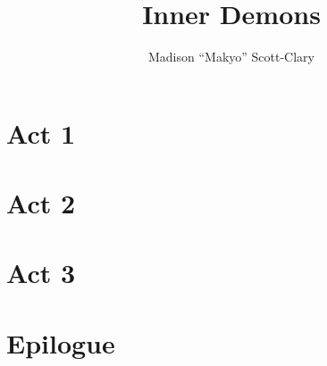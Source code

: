 \documentclass[12pt,letterpaper,oneside]{memoir}
\title{Inner Demons}
\author{Madison ``Makyo'' Scott-Clary}
\begin{document}
  \maketitle

  \newpage

  \part{Act 1}
  

  \part{Act 2}
  

  \part{Act 3}
  

  \part{Epilogue}
  
\end{document}
